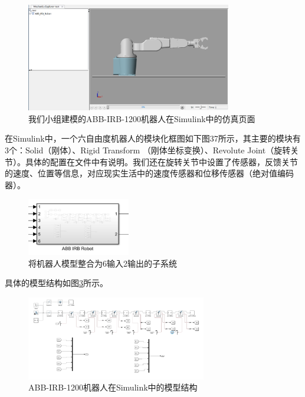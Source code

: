 \begin{figure}[htbp]
    \centering
    \includegraphics[width=0.8\textwidth]{Image/initial.png}
    \caption{我们小组建模的ABB-IRB-1200机器人在Simulink中的仿真页面}
    \label{fig:19}
\end{figure}

在Simulink中，一个六自由度机器人的模块化框图如下图37所示，其主要的模块有3个：Solid（刚体）、Rigid Transform （刚体坐标变换）、Revolute Joint（旋转关节）。具体的配置在文件中有说明。我们还在旋转关节中设置了传感器，反馈关节的速度、位置等信息，对应现实生活中的速度传感器和位移传感器（绝对值编码器）。

\begin{figure}[htbp]
    \centering
    \includegraphics[width=0.4\textwidth]{Image/ABBsubsys.png}
    \caption{将机器人模型整合为6输入2输出的子系统}
    \label{fig:21}
\end{figure}

具体的模型结构如图\ref{fig:20}所示。

\begin{figure}[htbp]
    \centering
    \includegraphics[width=0.7\textwidth]{Image/ABBIRB.png}
    \caption{ABB-IRB-1200机器人在Simulink中的模型结构}
    \label{fig:20}
\end{figure}

